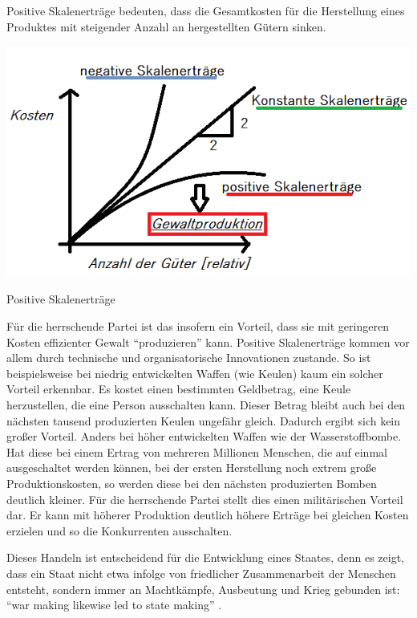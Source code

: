 Positive Skalenerträge bedeuten, dass die Gesamtkosten für die Herstellung eines Produktes mit steigender  Anzahl an hergestellten Gütern sinken.

\begin{dsafigure}
	\begin{center}
	\includegraphics[width=0.9\columnwidth]{img/Skalenertraege.png}
	\caption{Positive Skalenerträge}
	\label{fig:skalenertraege}
	\end{center}
\end{dsafigure}

Für die herrschende Partei ist das insofern ein Vorteil, dass sie mit geringeren Kosten effizienter Gewalt ``produzieren'' kann.
Positive Skalenerträge kommen vor allem durch technische und organisatorische Innovationen zustande.
So ist beispielsweise bei niedrig entwickelten Waffen (wie Keulen) kaum ein solcher Vorteil erkennbar.
Es kostet einen bestimmten Geldbetrag, eine Keule herzustellen, die eine Person ausschalten kann.
Dieser Betrag bleibt auch bei den nächsten tausend produzierten Keulen ungefähr gleich.
Dadurch ergibt sich kein großer Vorteil.
Anders bei höher entwickelten Waffen wie der Wasserstoffbombe.
Hat diese bei einem Ertrag von mehreren Millionen Menschen, die auf einmal ausgeschaltet werden können, bei der ersten Herstellung noch extrem große Produktionskosten, so werden diese bei den nächsten produzierten Bomben deutlich kleiner.
Für die herrschende Partei stellt dies einen militärischen Vorteil dar.
Er kann mit höherer Produktion deutlich höhere Erträge bei gleichen Kosten erzielen und so die Konkurrenten ausschalten.

Dieses Handeln ist entscheidend für die Entwicklung eines Staates, denn es zeigt, dass ein Staat nicht etwa infolge von friedlicher Zusammenarbeit der Menschen entsteht, sondern immer an Machtkämpfe, Ausbeutung und Krieg gebunden ist: ``war making likewise led to state making'' \parencite[183]{Tilly-1985-aa}.

